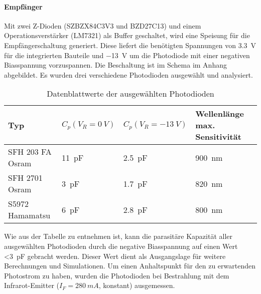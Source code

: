 \paragraph{Empfänger}
Mit zwei Z-Dioden (SZBZX84C3V3 und BZD27C13) und einem Operationsverstärker (LM7321) als Buffer geschaltet, wird eine Speisung für die Empfängerschaltung generiert. Diese liefert die benötigten Spannungen von \SI{3.3}{V} für die integrierten Bauteile und \SI{-13}{V} um die Photodiode mit einer negativen Biasspannung vorzuspannen. Die Beschaltung ist im Schema im Anhang abgebildet.
\newline
Es wurden drei verschiedene Photodioden ausgewählt und analysiert.

\begin{table}[H]
\begin{tabular}{|l|l|l|l|}
	\hline 
	\textbf{Typ}&\textbf{$C_{p} (V_{R}=\SI{0}{V})$}  & \textbf{$C_{p} (V_{R}=\SI{-13}{V})$} & \textbf{Wellenlänge max. Sensitivität} \\ 
	\hline 
	SFH 203 FA Osram&\SI{11}{pF}  & \SI{2.5}{pF} & \SI{900}{nm} \\ 
	\hline 
	SFH 2701 Osram&\SI{3}{pF}  &\SI{1.7}{pF}  &\SI{820}{nm}  \\ 
	\hline 
	S5972 Hamamatsu&\SI{6}{pF}  &\SI{2.8}{pF}  &\SI{800}{nm}  \\ 
	\hline 
\end{tabular} 
\caption{Datenblattwerte der ausgewählten Photodioden}\label{tab:Tabelle_Photo}
\end{table}

Wie aus der Tabelle zu entnehmen ist, kann die parasitäre Kapazität aller ausgewählten Photodioden durch die negative Biasspannung auf einen Wert \textless \SI{3}{pF} gebracht werden. Dieser Wert dient als Ausgangslage für weitere Berechnungen und Simulationen.
\newline
Um einen Anhaltspunkt für den zu erwartenden Photostrom zu haben, wurden die Photodioden bei Bestrahlung mit dem Infrarot-Emitter ($I_{F}=\SI{280}{mA}$, konstant) ausgemessen.

